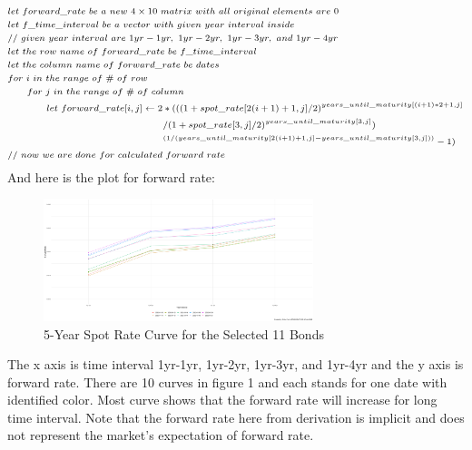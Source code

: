 \documentclass[10pt]{article}
\begin{document}
\begin{enumerate}
\begin{enumerate}
$$\begin{scriptsize}
\begin{aligned}
            & let \ forward\_rate \ be \ a \ new \ 4 \times 10 \ matrix \ with \ all \ original \ elements \ are \ 0 \\
            & let \ f\_time\_interval \ be \ a \ vector \ with \ given \ year \ interval \ inside \\
            & // \ given \ year \ interval \ are \ 1yr-1yr, \ 1yr-2yr, \ 1yr-3yr, \ and \ 1yr-4yr \\
            & let \ the \ row \ name \ of \ forward\_rate \ be \ f\_time\_interval \\
            & let \ the \ column \ name \ of \ forward\_rate \ be \ dates \\
            & for \ i \ in \ the \ range \ of \ \# \ of \ row \\
            & \qquad for \ j \ in \ the \ range \ of \ \# \ of \ column \\
            & \qquad \qquad let \ forward\_rate[i,j] \leftarrow 2*(((1+spot\_rate[2(i+1)+1,j]/2)^{years\_until\_maturity[(i+1)*2+1,j]} \\
            & \qquad \qquad \qquad \qquad \qquad \qquad \qquad \qquad /(1+spot\_rate[3,j]/2)^{years\_until\_maturity[3,j]}) \\ 
            & \qquad \qquad \qquad \qquad \qquad \qquad \qquad \qquad ^{(1/(years\_until\_maturity[2(i+1)+1,j] -years\_until\_maturity[3,j]))} -1) \\
            & // \ now \ we \ are \ done \ for \ calculated \ forward \ rate 
            \end{aligned}
            \end{scriptsize}
            $$
            And here is the plot for forward rate: 
            \begin{figure}[H]
                \centering
                \includegraphics[width=0.7\textwidth]{forward rate curve.png}
                \caption{5-Year Spot Rate Curve for the Selected 11 Bonds}
            \end{figure}
            The x axis is time interval  1yr-1yr, 1yr-2yr, 1yr-3yr, and 1yr-4yr and the y axis is forward rate. There are 10 curves in figure 1 and each stands for one date with identified color. Most curve shows that the forward rate will increase for long time interval. Note that the forward rate here from derivation is implicit and does not represent the market's expectation of forward rate.
    \end{enumerate}
        

\end{enumerate}
\end{document}
